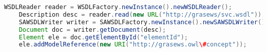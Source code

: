 \begin{lstlisting}[language=java,caption={[Exemplo de uso da biblioteca EasySAWSDL]\textbf{Exemplo de uso da biblioteca EasySAWSDL}.},label={lst:easywsdl}]
    WSDLReader reader = WSDLFactory.newInstance().newWSDLReader();
    Description desc = reader.read(new URL("http://grasews/svc.wsdl"));
    SAWSDLWriter writer = SAWSDLFactory.newInstance().newSAWSDLWriter();
    Document doc = writer.getDocument(desc);
    Element ele = doc.getElementById("elementId");
    ele.addModelReference(new URI("http://grasews.owl\#concept"));
\end{lstlisting}

